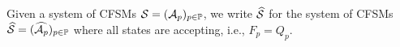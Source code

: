Given a system of CFSMs $\mathcal{S}=(\mathcal{A}_p)_{p\in\mathbb{P}}$,
we write $\widehat{\mathcal{S}}{}$ for the system of CFSMs 
$\widehat{\mathcal{S}}=(\widehat{\mathcal{A}_p})_{p\in\mathbb{P}}$
where all states are accepting, i.e., $F_p = Q_p$.

\bigskip




